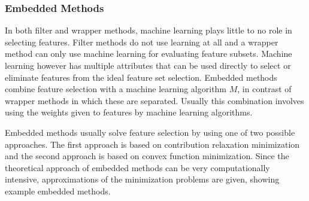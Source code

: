 \documentclass[10pt,a4paper]{report}
\begin{document}
	\subsubsection{Embedded Methods}
	\label{FSsubsec:EmbeddedMethods}
	
	In both filter and wrapper methods, machine learning plays little to no role in selecting features. Filter methods do not use learning at all and a wrapper method can only use machine learning for evaluating feature subsets. Machine learning however has multiple attributes that can be used directly to select or eliminate features from the ideal feature set selection. Embedded methods combine feature selection with a machine learning algorithm $M$, in contrast of wrapper methods in which these are separated\cite{Lal2006}. Usually this combination involves using the weights given to features by machine learning algorithms\cite{blum1997selection}.
	
	Embedded methods usually solve feature selection by using one of two possible approaches. The first approach is based on contribution relaxation minimization and the second approach is based on convex function minimization. Since the theoretical approach of embedded methods can be very computationally intensive, approximations of the minimization problems are given, showing example embedded methods\cite{Lal2006}.
	
\end{document}
